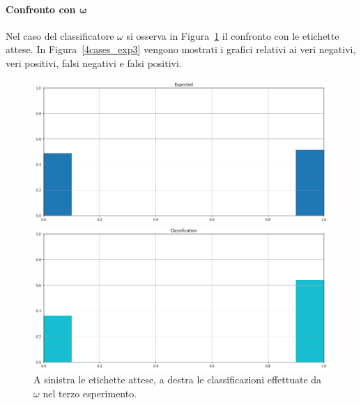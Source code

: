 \documentclass[12pt]{report}
\theoremstyle{definition}
\begin{document}
\paragraph{Confronto con $\bm{\omega}$}
Nel caso del classificatore $\omega$ si osserva in Figura~\ref{classification_exp3} il confronto con le etichette attese. 
In Figura~\ref{4cases_exp3} vengono mostrati i grafici relativi ai veri negativi, veri positivi, falsi negativi e falsi positivi.
\begin{figure}
\centering
    \begin{minipage}{0.48\textwidth}
        \includegraphics[width=\linewidth]{images/experiment_beta05_disgiunti/expected_classification.png}
    \end{minipage}
    \begin{minipage}{0.48\textwidth}
        \includegraphics[width=\linewidth]{images/experiment_beta05_disgiunti/prediction_classification.png}
    \end{minipage}
    \caption{A sinistra le etichette attese, a destra le classificazioni effettuate da $\omega$ nel terzo esperimento.}
    \label{classification_exp3}
\end{figure}
\end{document}
